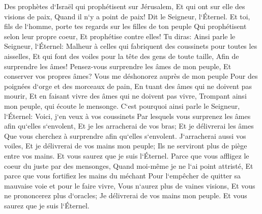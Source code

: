 \verse Des prophètes d`Israël qui prophétisent sur Jérusalem, Et qui ont sur elle des visions de paix, Quand il n`y a point de paix! Dit le Seigneur, l`Éternel. 
\verse Et toi, fils de l`homme, porte tes regards sur les filles de ton peuple Qui prophétisent selon leur propre coeur, Et prophétise contre elles! 
\verse Tu diras: Ainsi parle le Seigneur, l`Éternel: Malheur à celles qui fabriquent des coussinets pour toutes les aisselles, Et qui font des voiles pour la tête des gens de toute taille, Afin de surprendre les âmes! Pensez-vous surprendre les âmes de mon peuple, Et conserver vos propres âmes? 
\verse Vous me déshonorez auprès de mon peuple Pour des poignées d`orge et des morceaux de pain, En tuant des âmes qui ne doivent pas mourir, Et en faisant vivre des âmes qui ne doivent pas vivre, Trompant ainsi mon peuple, qui écoute le mensonge. 
\verse C`est pourquoi ainsi parle le Seigneur, l`Éternel: Voici, j`en veux à vos coussinets Par lesquels vous surprenez les âmes afin qu`elles s`envolent, Et je les arracherai de vos bras; Et je délivrerai les âmes Que vous cherchez à surprendre afin qu`elles s`envolent. 
\verse J`arracherai aussi vos voiles, Et je délivrerai de vos mains mon peuple; Ils ne serviront plus de piège entre vos mains. Et vous saurez que je suis l`Éternel. 
\verse Parce que vous affligez le coeur du juste par des mensonges, Quand moi-même je ne l`ai point attristé, Et parce que vous fortifiez les mains du méchant Pour l`empêcher de quitter sa mauvaise voie et pour le faire vivre, 
\verse Vous n`aurez plus de vaines visions, Et vous ne prononcerez plus d`oracles; Je délivrerai de vos mains mon peuple. Et vous saurez que je suis l`Éternel. 

